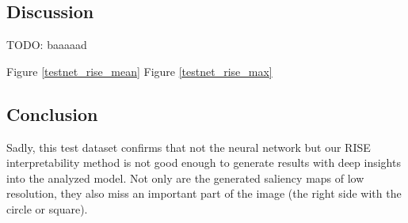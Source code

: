 \subsection{Discussion}
TODO: baaaaad

Figure \ref{testnet_rise_mean} Figure \ref{testnet_rise_max}

\subsection{Conclusion}
Sadly, this test dataset confirms that not the neural network but our RISE interpretability method is not good enough to generate results with deep insights into the analyzed model. Not only are the generated saliency maps of low resolution, they also miss an important part of the image (the right side with the circle or square).

